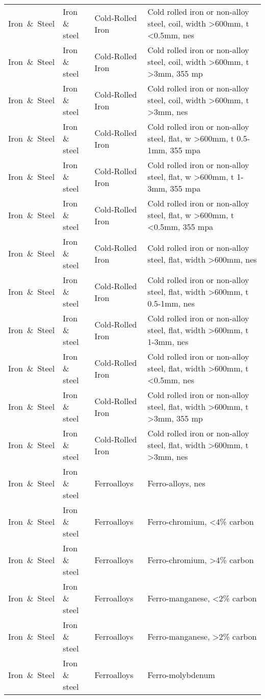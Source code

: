 \begin{appendices}
\begin{xltabular}{\textwidth}{|p{0.07\textwidth}|p{0.12\textwidth}|p{0.20\textwidth}|p{0.5\textwidth}|}
Iron\ \&\ Steel & Iron \& steel & Cold-Rolled Iron & Cold rolled iron or non-alloy steel, coil, width >600mm, t <0.5mm, nes \\
Iron\ \&\ Steel & Iron \& steel & Cold-Rolled Iron & Cold rolled iron or non-alloy steel, coil, width >600mm, t >3mm, 355 mp \\
Iron\ \&\ Steel & Iron \& steel & Cold-Rolled Iron & Cold rolled iron or non-alloy steel, coil, width >600mm, t >3mm, nes \\
Iron\ \&\ Steel & Iron \& steel & Cold-Rolled Iron & Cold rolled iron or non-alloy steel, flat, w >600mm, t 0.5-1mm, 355 mpa \\
Iron\ \&\ Steel & Iron \& steel & Cold-Rolled Iron & Cold rolled iron or non-alloy steel, flat, w >600mm, t 1-3mm, 355 mpa \\
Iron\ \&\ Steel & Iron \& steel & Cold-Rolled Iron & Cold rolled iron or non-alloy steel, flat, w >600mm, t <0.5mm, 355 mpa \\
Iron\ \&\ Steel & Iron \& steel & Cold-Rolled Iron & Cold rolled iron or non-alloy steel, flat, width >600mm, nes \\
Iron\ \&\ Steel & Iron \& steel & Cold-Rolled Iron & Cold rolled iron or non-alloy steel, flat, width >600mm, t 0.5-1mm, nes \\
Iron\ \&\ Steel & Iron \& steel & Cold-Rolled Iron & Cold rolled iron or non-alloy steel, flat, width >600mm, t 1-3mm, nes \\
Iron\ \&\ Steel & Iron \& steel & Cold-Rolled Iron & Cold rolled iron or non-alloy steel, flat, width >600mm, t <0.5mm, nes \\
Iron\ \&\ Steel & Iron \& steel & Cold-Rolled Iron & Cold rolled iron or non-alloy steel, flat, width >600mm, t >3mm, 355 mp \\
Iron\ \&\ Steel & Iron \& steel & Cold-Rolled Iron & Cold rolled iron or non-alloy steel, flat, width >600mm, t >3mm, nes \\
Iron\ \&\ Steel & Iron \& steel & Ferroalloys & Ferro-alloys, nes \\
Iron\ \&\ Steel & Iron \& steel & Ferroalloys & Ferro-chromium, <4\% carbon \\
Iron\ \&\ Steel & Iron \& steel & Ferroalloys & Ferro-chromium, >4\% carbon \\
Iron\ \&\ Steel & Iron \& steel & Ferroalloys & Ferro-manganese, <2\% carbon \\
Iron\ \&\ Steel & Iron \& steel & Ferroalloys & Ferro-manganese, >2\% carbon \\
Iron\ \&\ Steel & Iron \& steel & Ferroalloys & Ferro-molybdenum \\

\end{xltabular}
\end{appendices}

